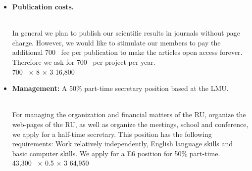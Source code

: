 \documentclass[10pt,fleqn,twoside]{article}
\begin{document}
\begin{itemize}
For regular expenses of the management (printing costs, postal services, toner,
viewgraphs, copying materials, etc..) we request 1000~\EUR{} per year.
\vspace{0.2em}\\
1000~\EUR{} $\times$ 3              \hfill 3,000~\EUR{}\\
\item 
\begin{Emphasize}
{\bf Publication costs.}
\end{Emphasize}\\
In general we plan to publish our scientific results in journals without
page charge.  However, we would like to stimulate our members to pay 
the additional 700~\EUR{} fee per publication to make the articles 
open access forever. Therefore we ask for 700~\EUR{} per project per
year.
\vspace{0.2em}\\
700~\EUR{} $\times$ 8 $\times$ 3              \hfill 16,800~\EUR{}\\
\item 
\begin{Emphasize}
{\bf Management:} A 50\% part-time secretary position based at the LMU.
\end{Emphasize}\\
For managing the organization and financial matters of the RU, 
organize the web-pages of the RU, as
well as organize the meetings, school and conference, we apply for
a half-time secretary. This position has the following requirements:
Work relatively independently, English language skills and 
basic computer skills. We apply for a E6 position for 50\% part-time.
\vspace{0.2em}\\
43,300~\EUR{} $\times$ 0.5 $\times$ 3              \hfill 64,950~\EUR{}\\
\end{itemize}
 
\end{document}
